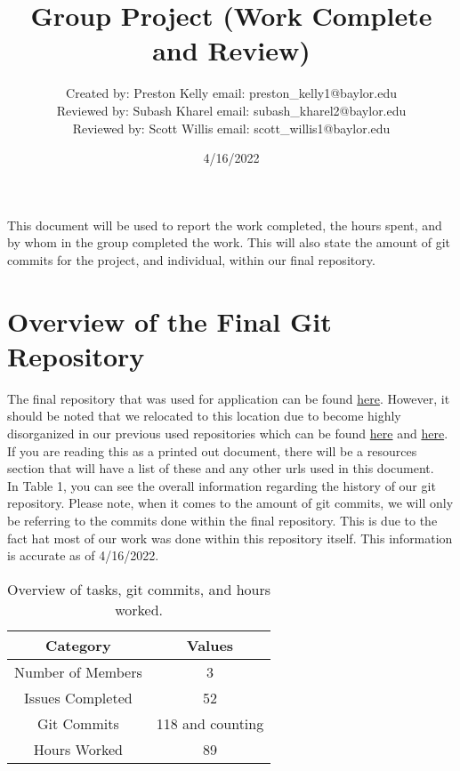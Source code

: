 \documentclass{article}
\title{Group Project (Work Complete and Review)}
\date{4/16/2022}
\author{Created by: Preston Kelly email: preston\_kelly1@baylor.edu \\
	Reviewed by: Subash Kharel email: subash\_kharel2@baylor.edu \\
	Reviewed by: Scott Willis email: scott\_willis1@baylor.edu
}
\begin{document}
	
	\maketitle
	
	This document will be used to report the work completed, the hours spent, and by whom in the group completed the work. This will also state the amount of git commits for the project, and individual, within our final repository.
	
	
	
	\section{Overview of the Final Git Repository}
	
	The final repository that was used for application can be found \href{https://github.com/willissa2121/library_checkout_proj_3}{here}. However, it should be noted that we relocated to this location due to become highly disorganized in our previous used repositories which can be found \href{https://github.com/willissa2121/library_checkout_proj_2}{here} and \href{https://github.com/willissa2121/library_checkout_proj}{here}. If you are reading this as a printed out document, there will be a resources section that will have a list of these and any other urls used in this document.\\
	
	In Table 1, you can see the overall information regarding the history of our git repository. Please note, when it comes to the amount of git commits, we will only be referring to the commits done within the final repository. This is due to the fact hat most of our work was done within this repository itself. This information is accurate as of 4/16/2022. \\
	
	\begin{table}[htbp!]
		\centering
		\begin{tabular}{||c c ||} 
			\hline
			Category & Values \\ [0.5ex] 
			\hline\hline
			Number of Members & 3 \\
			Issues Completed & 52  \\ 
			Git Commits & 118 and counting \\
			Hours Worked & 89 \\
			\hline
		\end{tabular}
		\caption{Overview of tasks, git commits, and hours worked.}
		\label{table:1}
	\end{table}
	
\end{document}
